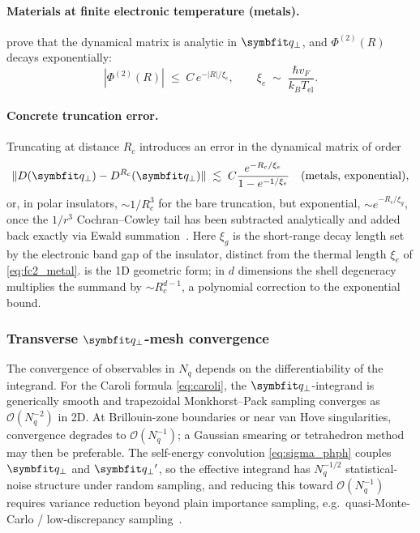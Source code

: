 \paragraph{Materials at finite electronic temperature (metals).}
 prove that the
dynamical matrix is analytic in $\qp$, and
$\Phi^{(2)}(R)$ decays exponentially:
\begin{equation}\label{eq:fc2_metal}
  |\Phi^{(2)}(R)|\;\le\;C\,e^{-|R|/\xi_e},\qquad
  \xi_e \;\sim\;\frac{\hbar v_F}{k_B T_{\mathrm{el}}}.
\end{equation}

\paragraph{Concrete truncation error.}
Truncating at distance $R_c$ introduces an error in the dynamical matrix
of order
\begin{equation}\label{eq:fc2_error_metal}
  \|D(\qp) - D^{R_c}(\qp)\| \;\lesssim\;C \frac{e^{-R_c/\xi_e}}{1 - e^{-1/\xi_e}}
  \quad\text{(metals, exponential)},
\end{equation}
or, in polar insulators, $\sim 1/R_c^3$ for the bare truncation, but
exponential, $\sim e^{-R_c/\xi_g}$, once the
$1/r^3$ Cochran--Cowley tail has been subtracted analytically and added
back exactly via Ewald summation~\cite{gonze_dynamical_1997}. Here
$\xi_g$ is the short-range decay length set by the electronic band gap
of the insulator, distinct from the thermal length $\xi_e$ of
\cref{eq:fc2_metal}.  is the 1D geometric
form; in $d$ dimensions the shell degeneracy multiplies the summand by
$\sim R_c^{d-1}$, a polynomial correction to the exponential bound.

\subsubsection{Transverse $\qp$-mesh convergence}
\label{subsub:qp_decay}

The convergence of observables in $N_q$ depends on the differentiability
of the integrand. For the Caroli formula \cref{eq:caroli}, the
$\qp$-integrand is generically smooth and trapezoidal Monkhorst--Pack
sampling converges as $\mathcal{O}(N_q^{-2})$ in 2D. At Brillouin-zone boundaries or near van
Hove singularities, convergence degrades to $\mathcal{O}(N_q^{-1})$;
a Gaussian smearing or tetrahedron method may then be preferable. The
self-energy convolution \cref{eq:sigma_phph} couples $\qp$ and $\qp{}'$,
so the effective integrand has $N_q^{-1/2}$ statistical-noise structure
under random sampling, and reducing this toward $\mathcal{O}(N_q^{-1})$ requires
variance reduction beyond plain importance sampling, e.g.\ quasi-Monte-Carlo /
low-discrepancy sampling~\cite{lee_anharmonic_2018}.

